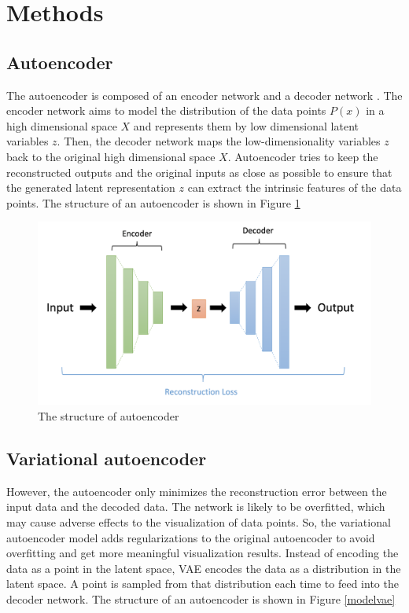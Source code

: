 \section{Methods}
\subsection{Autoencoder}
The autoencoder is composed of an encoder network and a decoder network \cite{wang2016auto}. The encoder network aims to model the distribution of the data points $P(x)$ in a high dimensional space $X$ and represents them by low dimensional latent variables $z$. Then, the decoder network maps the low-dimensionality variables $z$ back to the original high dimensional space $X$. Autoencoder tries to keep the reconstructed outputs and the original inputs as close as possible to ensure that the generated latent representation $z$ can extract the intrinsic features of the data points. The structure of an autoencoder is shown in Figure \ref{modelae}

\begin{figure}[htb!]
    \centering
    \includegraphics[width=1\textwidth]{figures/myfigures/ae.png}
    \caption{The structure of autoencoder}
    \label{modelae}
\end{figure}

\subsection{Variational autoencoder}
However, the autoencoder only minimizes the reconstruction error between the input data and the decoded data. The network is likely to be overfitted, which may cause adverse effects to the visualization of data points. So, the variational autoencoder model adds regularizations to the original autoencoder to avoid overfitting and get more meaningful visualization results. Instead of encoding the data as a point in the latent space, VAE encodes the data as a distribution in the latent space. A point is sampled from that distribution each time to feed into the decoder network. The structure of an autoencoder is shown in Figure \ref{modelvae}

